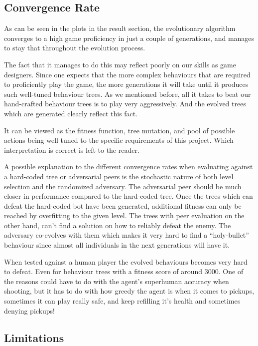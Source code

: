 \documentclass[a4paper, twocolumn]{article}
\begin{document}
    \subsection*{Convergence Rate}

    As can be seen in the plots in the result section, the evolutionary algorithm converges to a high game proficiency in just a couple of generations, and manages to stay that throughout the evolution process.

    The fact that it manages to do this may reflect poorly on our skills as game designers. Since one expects that the more complex behaviours that are required to proficiently play the game, the more generations it will take until it produces such well-tuned behaviour trees. As we mentioned before, all it takes to beat our hand-crafted behaviour trees is to play very aggressively. And the evolved trees which are generated clearly reflect this fact.

    It can be viewed as the fitness function, tree mutation, and pool of possible actions being well tuned to the specific requirements of this project. Which interpretation is correct is left to the reader.

    A possible explanation to the different convergence rates when evaluating against a hard-coded tree or adversarial peers is the stochastic nature of both level selection and the randomized adversary. The adversarial peer should be much closer in performance compared to the hard-coded tree. Once the trees which can defeat the hard-coded bot have been generated, additional fitness can only be reached by overfitting to the given level. The trees with peer evaluation on the other hand, can't find a solution on how to reliably defeat the enemy. The adversary co-evolves with them which makes it very hard to find a ``holy-bullet'' behaviour since almost all individuals in the next generations will have it.

    When tested against a human player the evolved behaviours becomes very hard to defeat. Even for behaviour trees with a fitness score of around 3000. One of the reasons could have to do with the agent's superhuman accuracy when shooting, but it has to do with how greedy the agent is when it comes to pickups, sometimes it can play really safe, and keep refilling it's health and sometimes denying pickups!

    \subsection*{Limitations}
\end{document}
